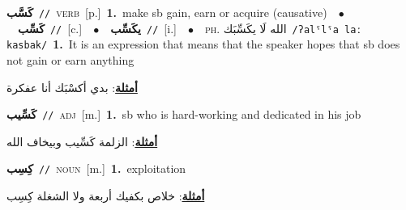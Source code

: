 \documentclass[10pt,a4paper,twoside]{article} %
\begin{document}
\begin{multicols}{2}
{\setlength\topsep{0pt}\textbf{\foreignlanguage{arabic}{كَسَّب}}\ {\color{gray}\texttt{//}\color{black}}\ \textsc{verb}\ [p.]\ \textbf{1.}~make sb gain, earn or acquire (causative)\ \ $\bullet$\ \ \setlength\topsep{0pt}\textbf{\foreignlanguage{arabic}{كَسِّب}}\ {\color{gray}\texttt{//}\color{black}}\ [c.]\ \ $\bullet$\ \ \setlength\topsep{0pt}\textbf{\foreignlanguage{arabic}{يكَسِّب}}\ {\color{gray}\texttt{//}\color{black}}\ [i.]\ \ $\bullet$\ \ \textsc{ph.} \color{gray} \foreignlanguage{arabic}{الله لَا يكَسِّبَك}\color{black}\ {\color{gray}\texttt{/{\sffamily ʔalˤlˤa laː kasbak}/}\color{black}}\ \textbf{1.}~It is an expression that means that the speaker hopes that sb does not gain or earn anything\  \begin{flushright}\color{gray}\foreignlanguage{arabic}{\textbf{\underline{\foreignlanguage{arabic}{أمثلة}}}: بدي أكسْبَك أنا عفكرة}\end{flushright}\color{black}} \vspace{2mm}

{\setlength\topsep{0pt}\textbf{\foreignlanguage{arabic}{كَسِّيب}}\ {\color{gray}\texttt{//}\color{black}}\ \textsc{adj}\ [m.]\ \textbf{1.}~sb who is hard-working and dedicated in his job\  \begin{flushright}\color{gray}\foreignlanguage{arabic}{\textbf{\underline{\foreignlanguage{arabic}{أمثلة}}}: الزلمة كَسِّيب وبيخاف الله}\end{flushright}\color{black}} \vspace{2mm}

{\setlength\topsep{0pt}\textbf{\foreignlanguage{arabic}{كِسِب}}\ {\color{gray}\texttt{//}\color{black}}\ \textsc{noun}\ [m.]\ \textbf{1.}~exploitation\  \begin{flushright}\color{gray}\foreignlanguage{arabic}{\textbf{\underline{\foreignlanguage{arabic}{أمثلة}}}: خلاص بكفيك أربعة ولا الشغلة كِسِب}\end{flushright}\color{black}} \vspace{2mm}


\end{multicols}
\end{document}
